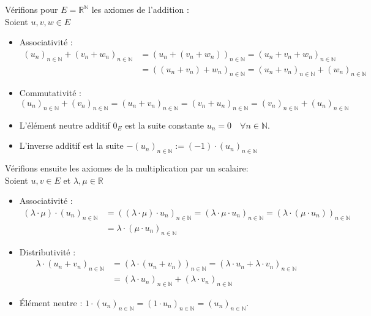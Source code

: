 \documentclass[a4paper, 10pt]{report}
\begin{document}
\begin{enumerate}[label=\arabic*.]
		\colorbox{solution}
		{
			\begin{minipage}{0.9\textwidth}
				Vérifions pour $E = \mathbb{R}^{\mathbb{N}}$
				les axiomes de l'addition :\\
				Soient $u, v, w \in E$
				\begin{itemize}
					\item Associativité : 
					\[
					\begin{aligned}
						(u_n)_{n \in \mathbb{N}} + (v_n + w_n)_{n \in \mathbb{N}}
						&= (u_n + (v_n + w_n))_{n \in \mathbb{N}}
						= (u_n + v_n + w_n)_{n \in \mathbb{N}}\\
						&= ((u_n + v_n) + w_n)_{n \in \mathbb{N}}
						= (u_n + v_n)_{n \in \mathbb{N}} + (w_n)_{n \in \mathbb{N}}
					\end{aligned}
					\]
					\item Commutativité :
					\[
						(u_n)_{n \in \mathbb{N}} + (v_n)_{n \in \mathbb{N}}
						= (u_n + v_n)_{n \in \mathbb{N}}
						= (v_n + u_n)_{n \in \mathbb{N}}
						= (v_n)_{n \in \mathbb{N}} + (u_n)_{n \in \mathbb{N}}
					\]
					\item L'élément neutre additif $0_E$ est la suite
					constante $u_n = 0 \quad \forall n \in \mathbb{N}$.
					\item L'inverse additif est la suite
					$-(u_n)_{n \in \mathbb{N}} := (-1) \cdot (u_n)_{n \in \mathbb{N}}$
				\end{itemize}
				
				\vspace{5mm}
				Vérifions ensuite les axiomes de la multiplication par
				un scalaire:\\
				Soient $u, v \in E$ et $\lambda, \mu \in \mathbb{R}$
				\begin{itemize}
					\item Associativité : 
					\[
					\begin{aligned}
						(\lambda \cdot \mu) \cdot (u_n)_{n \in \mathbb{N}}
						&= ((\lambda \cdot \mu) \cdot u_n)_{n \in \mathbb{N}}
						= (\lambda \cdot \mu \cdot u_n)_{n \in \mathbb{N}}
						= (\lambda \cdot (\mu \cdot u_n))_{n \in \mathbb{N}}\\
						&= \lambda \cdot (\mu \cdot u_n)_{n \in \mathbb{N}}
					\end{aligned}
					\]
					\item Distributivité :
					\[
					\begin{aligned}
						\lambda \cdot (u_n + v_n)_{n \in \mathbb{N}}
						&= (\lambda \cdot (u_n + v_n))_{n \in \mathbb{N}}
						= (\lambda \cdot u_n
							+ \lambda \cdot v_n)_{n \in \mathbb{N}}\\
						&= (\lambda \cdot u_n)_{n \in \mathbb{N}}
							+ (\lambda \cdot v_n)_{n \in \mathbb{N}}
					\end{aligned}
					\]
					\item Élément neutre :
					$1 \cdot (u_n)_{n \in \mathbb{N}}
					= (1 \cdot u_n)_{n \in \mathbb{N}}
					= (u_n)_{n \in \mathbb{N}}$.
				\end{itemize}
			\end{minipage}
		}
		
	\end{enumerate}
\end{document}
